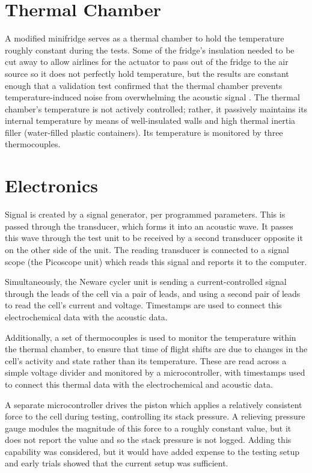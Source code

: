 \section{Thermal Chamber}
A modified minifridge serves as a thermal chamber to hold the temperature roughly constant during the tests. Some of the fridge's insulation needed to be cut away to allow airlines for the actuator to pass out of the fridge to the air source so it does not perfectly hold temperature, but the results are constant enough that a validation test confirmed that the thermal chamber prevents temperature-induced noise from overwhelming the acoustic signal . The thermal chamber's temperature is not actively controlled; rather, it passively maintains its internal temperature by means of well-insulated walls and high thermal inertia filler (water-filled plastic containers). Its temperature is monitored by three thermocouples.

\section{Electronics}

Signal is created by a signal generator, per programmed parameters. This is passed through the transducer, which forms it into an acoustic wave. It passes this wave through the test unit to be received by a second transducer opposite it on the other side of the unit. The reading transducer is connected to a signal scope (the Picoscope unit) which reads this signal and reports it to the computer.

Simultaneously, the Neware cycler unit is sending a current-controlled signal through the leads of the cell via a pair of leads, and using a second pair of leads to read the cell's current and voltage. Timestamps are used to connect this electrochemical data with the acoustic data.

Additionally, a set of thermocouples is used to monitor the temperature within the thermal chamber, to ensure that time of flight shifts are due to changes in the cell's activity and state rather than its temperature. These are read across a simple voltage divider and monitored by a microcontroller, with timestamps used to connect this thermal data with the electrochemical and acoustic data.

A separate microcontroller drives the piston which applies a relatively consistent force to the cell during testing, controlling its stack pressure. A relieving pressure gauge modules the magnitude of this force to a roughly constant value, but it does not report the value and so the stack pressure is not logged. Adding this capability was considered, but it would have added expense to the testing setup and early trials showed that the current setup was sufficient.
